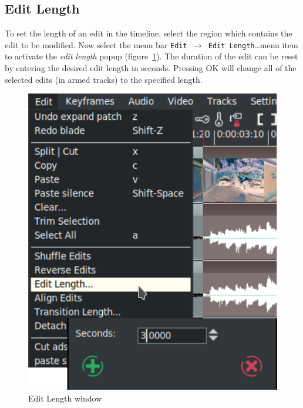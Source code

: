 \subsection{Edit Length}%
\label{sub:edit-lenght}

To set the length of an edit in the timeline, select the region which contains the edit to be modified. Now select the menu bar \texttt{Edit $\rightarrow$ Edit Length}\dots menu item to activate the \textit{edit length} popup (figure~\ref{fig:lenght}).  The duration of the edit can be reset by entering the desired edit length in seconds.  Pressing OK will change all of the selected edits (in armed tracks) to the specified length.
\begin{figure}[htpb]
    \centering
    \includegraphics[width=0.6\linewidth]{images/lenght.png}
    \caption{Edit Length window}
    \label{fig:lenght}
\end{figure}

